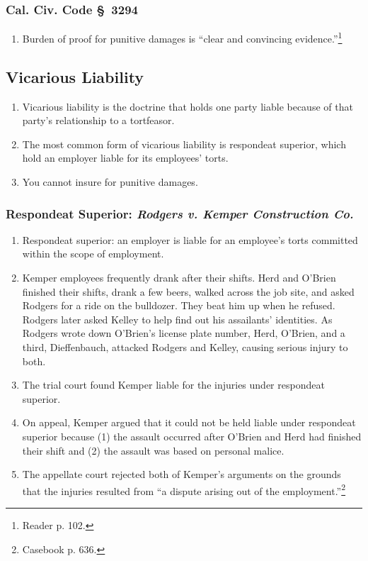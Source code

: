 \subsubsection{Cal. Civ. Code \S\ 3294}

\begin{enumerate}
    \item Burden of proof for punitive damages is ``clear and convincing
    evidence.''\footnote{Reader p. 102.}
\end{enumerate}

\subsection{Vicarious Liability}

\begin{enumerate}
    \item Vicarious liability is the doctrine that holds one party liable
    because of that party's relationship to a tortfeasor.
    \item The most common form of vicarious liability is respondeat superior,
    which hold an employer liable for its employees' torts.
    \item You cannot insure for punitive damages.
\end{enumerate}

\subsubsection{Respondeat Superior: \emph{Rodgers v. Kemper Construction Co.}}

\begin{enumerate}
    \item Respondeat superior: an employer is liable for an employee's torts 
    committed within the scope of employment.
    \item Kemper employees frequently drank after their shifts. Herd and O'Brien 
    finished their shifts, drank a few beers, walked across the job site, and 
    asked Rodgers for a ride on the bulldozer. They beat him up when he refused. 
    Rodgers later asked Kelley to help find out his assailants' identities. As 
    Rodgers wrote down O'Brien's license plate number, Herd, O'Brien, and a 
    third, Dieffenbauch, attacked Rodgers and Kelley, causing serious injury to 
    both.
    \item The trial court found Kemper liable for the injuries under respondeat 
    superior.
    \item On appeal, Kemper argued that it could not be held liable under 
    respondeat superior because (1) the assault occurred after O'Brien and Herd 
    had finished their shift and (2) the assault was based on personal malice.
    \item The appellate court rejected both of Kemper's arguments on the grounds 
    that the injuries resulted from ``a dispute arising out of the 
    employment.''\footnote{Casebook p. 636.}
\end{enumerate}

